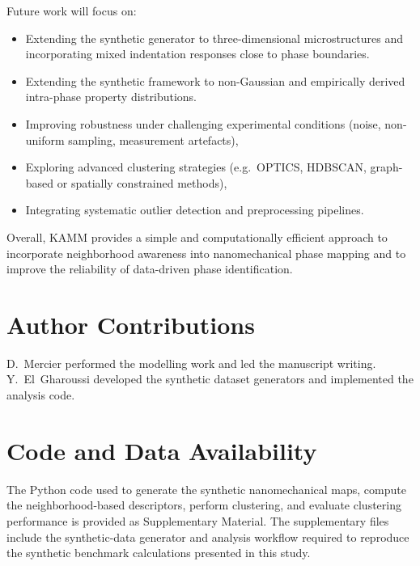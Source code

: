 \documentclass[final,3p,times]{elsarticle}
\begin{document}
Future work will focus on:
\begin{itemize}
    \item Extending the synthetic generator to three-dimensional microstructures and incorporating mixed indentation responses close to phase boundaries.
    \item Extending the synthetic framework to non-Gaussian and empirically derived intra-phase property distributions.
    \item Improving robustness under challenging experimental conditions (noise, non-uniform sampling, measurement artefacts),
    \item Exploring advanced clustering strategies (e.g.\ OPTICS, HDBSCAN, graph-based or spatially constrained methods),
    \item Integrating systematic outlier detection and preprocessing pipelines.
\end{itemize}

Overall, KAMM provides a simple and computationally efficient approach to incorporate neighborhood awareness into nanomechanical phase mapping and to improve the reliability of data-driven phase identification.

\section*{Author Contributions}

D.~Mercier performed the modelling work and led the manuscript writing.  
Y.~El~Gharoussi developed the synthetic dataset generators and implemented the analysis code.

\section*{Code and Data Availability} The Python code used to generate the synthetic nanomechanical maps, compute the neighborhood-based descriptors, perform clustering, and evaluate clustering performance is provided as Supplementary Material. The supplementary files include the synthetic-data generator and analysis workflow required to reproduce the synthetic benchmark calculations presented in this study.

\end{document}
